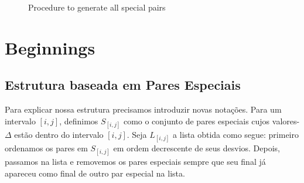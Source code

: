\documentclass[12pt]{article}
\begin{document}
\begin{figure}


\caption{Procedure to generate all special pairs}
\label{fig:GenSpecialPairs}
\end{figure}


\section{Beginnings}

\subsection{Estrutura baseada em Pares Especiais}

Para explicar nossa estrutura precisamos introduzir novas notações.
Para um intervalo $[i, j]$, definimos $S_{[i,j]}$ como o conjunto
de pares especiais cujos valores-$\Delta$ estão dentro do intervalo $[i, j]$.
Seja $L_{[i, j]}$ a lista obtida como segue: primeiro ordenamos os pares
em $S_{[i, j]}$ em ordem decrescente de seus desvios. Depois, passamos na lista
e removemos os pares especiais sempre que seu final já apareceu como final de outro
par especial na lista.
\end{document}
